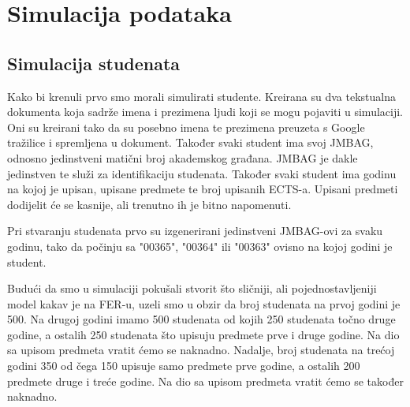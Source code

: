 \documentclass[times, utf8, zavrsni, numeric]{fer}
\begin{document}
\section{Simulacija podataka}

\subsection*{Simulacija studenata}
Kako bi krenuli prvo smo morali simulirati studente. Kreirana su dva tekstualna dokumenta koja sadrže imena i prezimena ljudi koji se mogu pojaviti u simulaciji. Oni su kreirani tako da su posebno imena te prezimena preuzeta s Google tražilice i spremljena u dokument.
Također svaki student ima svoj JMBAG, odnosno jedinstveni matični broj akademskog građana. JMBAG je dakle jedinstven te služi za identifikaciju studenata. Također svaki student ima godinu na kojoj je upisan, upisane predmete te broj upisanih ECTS-a. Upisani predmeti dodijelit će se kasnije, ali trenutno ih je bitno napomenuti.\par
Pri stvaranju studenata prvo su izgenerirani jedinstveni JMBAG-ovi za svaku godinu, tako da počinju sa "00365", "00364" ili "00363" ovisno na kojoj godini je student.\par
Budući da smo u simulaciji pokušali stvorit što sličniji, ali pojednostavljeniji model kakav je na FER-u, uzeli smo u obzir da broj studenata na prvoj godini je 500. Na drugoj godini imamo 500 studenata od kojih 250 studenata točno druge godine, a ostalih 250 studenata što upisuju predmete prve i druge godine. Na dio sa upisom predmeta vratit ćemo se naknadno. Nadalje, broj studenata na trećoj godini 350 od čega 150 upisuje samo predmete prve godine, a ostalih 200 predmete druge i treće godine. Na dio sa upisom predmeta vratit ćemo se također naknadno.\par
\end{document}
